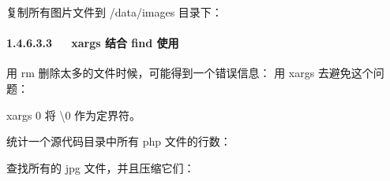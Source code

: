 \documentclass[letterpaper,12pt,english]{sphinxmanual}
\begin{document}
复制所有图片文件到 /data/images 目录下：

\begin{sphinxVerbatim}[commandchars=\\\{\}]
         
\end{sphinxVerbatim}


\paragraph{1.4.6.3.3   xargs 结合 find 使用}
\label{\detokenize{001software/001install/linux:xargs-find}}
用 rm
删除太多的文件时候，可能得到一个错误信息： 用 xargs 去避免这个问题：

\begin{sphinxVerbatim}[commandchars=\\\{\}]
           
\end{sphinxVerbatim}

xargs \sphinxhyphen{}0 将 \textbackslash{}0 作为定界符。

统计一个源代码目录中所有 php 文件的行数：

\begin{sphinxVerbatim}[commandchars=\\\{\}]
           
\end{sphinxVerbatim}

查找所有的 jpg 文件，并且压缩它们：

\begin{sphinxVerbatim}[commandchars=\\\{\}]
           
\end{sphinxVerbatim}
\end{document}
